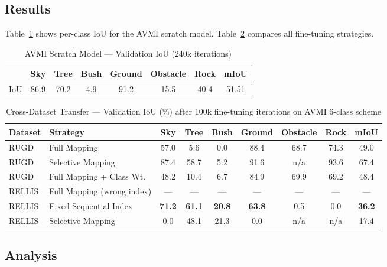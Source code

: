 \documentclass[conference]{IEEEtran}
\begin{document}
\subsection{Results}

Table~\ref{tab:avmi_scratch} shows per-class IoU for the AVMI scratch model. Table~\ref{tab:transfer} compares all fine-tuning strategies.

\begin{table}[h]
\centering
\caption{AVMI Scratch Model — Validation IoU (240k iterations)}
\label{tab:avmi_scratch}
\begin{tabular}{lcccccc|c}
\toprule
 & Sky & Tree & Bush & Ground & Obstacle & Rock & mIoU \\
\midrule
IoU & 86.9 & 70.2 & 4.9 & 91.2 & 15.5 & 40.4 & 51.51 \\
\bottomrule
\end{tabular}
\end{table}

\begin{table}[t]
\centering
\caption{Cross-Dataset Transfer — Validation IoU (\%) after 100k fine-tuning iterations on AVMI 6-class scheme}
\label{tab:transfer}
\begin{tabular}{llcccccc|c}
\toprule
\textbf{Dataset} & \textbf{Strategy} & \textbf{Sky} & \textbf{Tree} & \textbf{Bush} & \textbf{Ground} & \textbf{Obstacle} & \textbf{Rock} & \textbf{mIoU} \\
\midrule
RUGD   & Full Mapping               & 57.0 &  5.6 & 0.0 & 88.4 & 68.7 & 74.3 & 49.0 \\
RUGD   & Selective Mapping          & 87.4 & 58.7 & 5.2 & 91.6 & n/a  & 93.6 & 67.4 \\
RUGD   & Full Mapping + Class Wt.   & 48.2 & 10.4 & 6.7 & 84.9 & 69.9 & 69.2 & 48.4 \\
\midrule
RELLIS & Full Mapping (wrong index) & ---  & ---  & --- & ---  & ---  & ---  & ---  \\
RELLIS & Fixed Sequential Index     & \textbf{71.2} & \textbf{61.1} & \textbf{20.8} & \textbf{63.8} & 0.5 & 0.0 & \textbf{36.2} \\
RELLIS & Selective Mapping          & 0.0  & 48.1 & 21.3 & 0.0 & n/a  & n/a  & 17.4 \\
\bottomrule
\end{tabular}
\end{table}

\subsection{Analysis}
\end{document}
